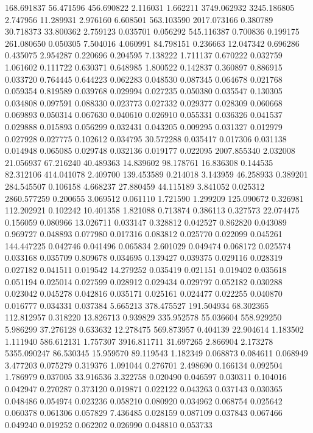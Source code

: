 168.691837
56.471596
456.690822
2.116031
1.662211
3749.062932
3245.186805
2.747956
11.289931
2.976160
6.608501
563.103590
2017.073166
0.380789
30.718373
33.800362
2.759123
0.035701
0.056292
545.116387
0.700836
0.199175
261.080650
0.050305
7.504016
4.060991
84.798151
0.236663
12.047342
0.696286
0.435075
2.954287
0.220696
0.204595
7.138222
1.711137
0.670222
0.032759
1.061602
0.111722
0.630371
0.648985
1.800522
0.142837
0.360897
0.886915
0.033720
0.764445
0.644223
0.062283
0.048530
0.087345
0.064678
0.021768
0.059354
0.819589
0.039768
0.029994
0.027235
0.050380
0.035547
0.130305
0.034808
0.097591
0.088330
0.023773
0.027332
0.029377
0.028309
0.060668
0.069893
0.050314
0.067630
0.040610
0.026910
0.055331
0.036326
0.041537
0.029888
0.015893
0.056299
0.032431
0.043205
0.009295
0.031327
0.012979
0.027928
0.027775
0.102612
0.034795
30.572288
0.035417
0.017306
0.031138
0.014948
0.065085
0.029748
0.032136
0.019177
0.022095
2007.855340
2.032008
21.056937
67.216240
40.489363
14.839602
98.178761
16.836308
0.144535
82.312106
414.041078
2.409700
139.453589
0.214018
3.143959
46.258933
0.389201
284.545507
0.106158
4.668237
27.880459
44.115189
3.841052
0.025312
2860.577259
0.200655
3.069512
0.061110
1.721590
1.299209
125.090672
0.326981
112.202921
0.102242
10.401358
1.821088
0.713874
0.386113
0.327573
22.074475
0.156059
0.080966
13.026711
0.033147
0.328812
0.042527
0.862820
0.043089
0.969727
0.048893
0.077980
0.017316
0.083812
0.025770
0.022099
0.045261
144.447225
0.042746
0.041496
0.065834
2.601029
0.049474
0.068172
0.025574
0.033168
0.035709
0.809678
0.034695
0.139427
0.039375
0.029116
0.028319
0.027182
0.041511
0.019542
14.279252
0.035419
0.021151
0.019402
0.035618
0.051194
0.025014
0.027599
0.028912
0.029434
0.029797
0.052182
0.030288
0.023042
0.045278
0.042816
0.035171
0.025161
0.024477
0.022255
0.040870
0.016777
0.034331
0.037384
5.665213
378.475527
191.504934
68.302365
112.812957
0.318220
13.826713
0.939829
335.952578
55.036604
558.929250
5.986299
37.276128
0.633632
12.278475
569.873957
0.404139
22.904614
1.183502
1.111940
586.612131
1.757307
3916.811711
31.697265
2.866904
2.173278
5355.090247
86.530345
15.959570
89.119543
1.182349
0.068873
0.084611
0.068949
3.477203
0.075279
0.319376
1.091044
0.276701
2.498690
0.166134
0.092504
1.786979
0.037005
33.916536
3.322758
0.020490
0.046597
0.030311
0.104016
0.042947
0.270287
0.373120
0.019871
0.022122
0.043263
0.037143
0.030365
0.048486
0.054974
0.023236
0.058210
0.080920
0.034962
0.068754
0.025642
0.060378
0.061306
0.057829
7.436485
0.028159
0.087109
0.037843
0.067466
0.049240
0.019252
0.062202
0.026990
0.048810
0.053733
